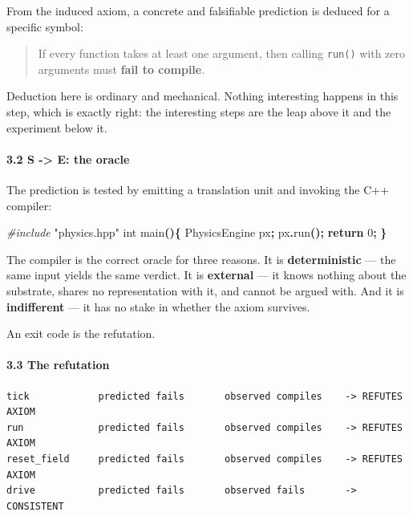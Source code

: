 \documentclass[
  11pt,
  a4paper,
]{article}
\newenvironment{Shaded}{\begin{snugshade}}{\end{snugshade}}
\newcommand{\ControlFlowTok}[1]{\textcolor[rgb]{0.13,0.29,0.53}{\textbf{#1}}}
\newcommand{\DataTypeTok}[1]{\textcolor[rgb]{0.13,0.29,0.53}{#1}}
\newcommand{\DecValTok}[1]{\textcolor[rgb]{0.00,0.00,0.81}{#1}}
\newcommand{\ImportTok}[1]{#1}
\newcommand{\NormalTok}[1]{#1}
\newcommand{\OperatorTok}[1]{\textcolor[rgb]{0.81,0.36,0.00}{\textbf{#1}}}
\newcommand{\PreprocessorTok}[1]{\textcolor[rgb]{0.56,0.35,0.01}{\textit{#1}}}
\begin{document}
From the induced axiom, a concrete and falsifiable prediction is deduced
for a specific symbol:

\begin{quote}
If every function takes at least one argument, then calling
\texttt{run()} with zero arguments must \textbf{fail to compile}.
\end{quote}

Deduction here is ordinary and mechanical. Nothing interesting happens
in this step, which is exactly right: the interesting steps are the leap
above it and the experiment below it.

\paragraph{3.2 S -\textgreater{} E: the oracle}\label{s---e-the-oracle}

The prediction is tested by emitting a translation unit and invoking the
C++ compiler:

\begin{Shaded}
\begin{Highlighting}[]
\PreprocessorTok{\#include }\ImportTok{"physics.hpp"}
\DataTypeTok{int}\NormalTok{ main}\OperatorTok{()\{}\NormalTok{ PhysicsEngine px}\OperatorTok{;}\NormalTok{ px}\OperatorTok{.}\NormalTok{run}\OperatorTok{();} \ControlFlowTok{return} \DecValTok{0}\OperatorTok{;} \OperatorTok{\}}
\end{Highlighting}
\end{Shaded}

The compiler is the correct oracle for three reasons. It is
\textbf{deterministic} --- the same input yields the same verdict. It is
\textbf{external} --- it knows nothing about the substrate, shares no
representation with it, and cannot be argued with. And it is
\textbf{indifferent} --- it has no stake in whether the axiom survives.

An exit code is the refutation.

\paragraph{3.3 The refutation}\label{the-refutation}

\begin{verbatim}
tick            predicted fails       observed compiles    -> REFUTES AXIOM
run             predicted fails       observed compiles    -> REFUTES AXIOM
reset_field     predicted fails       observed compiles    -> REFUTES AXIOM
drive           predicted fails       observed fails       -> CONSISTENT
\end{verbatim}
\end{document}
